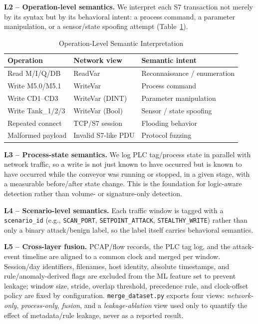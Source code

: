\documentclass[conference]{IEEEtran}
\begin{document}
\textbf{L2 -- Operation-level semantics.} We interpret each S7 transaction not merely by its syntax but by its behavioral intent: a process command, a parameter manipulation, or a sensor/state spoofing attempt (Table~\ref{tab:opsem}).

\begin{table}[t]
\centering
\caption{Operation-Level Semantic Interpretation}
\label{tab:opsem}
\begin{tabular}{p{1.9cm}p{2.0cm}p{2.5cm}}
\toprule
\textbf{Operation} & \textbf{Network view} & \textbf{Semantic intent} \\
\midrule
Read M/I/Q/DB & ReadVar & Reconnaissance / enumeration \\
Write M5.0/M5.1 & WriteVar & Process command \\
Write CD1--CD3 & WriteVar (DINT) & Parameter manipulation \\
Write Tank\_1/2/3 & WriteVar (Bool) & Sensor / state spoofing \\
Repeated connect & TCP/S7 session & Flooding behavior \\
Malformed payload & Invalid S7-like PDU & Protocol fuzzing \\
\bottomrule
\end{tabular}
\end{table}

\textbf{L3 -- Process-state semantics.} We log PLC tag/process state in parallel with network traffic, so a write is not just known to have occurred but is known to have occurred while the conveyor was running or stopped, in a given stage, with a measurable before/after state change. This is the foundation for logic-aware detection rather than volume- or signature-only detection.

\textbf{L4 -- Scenario-level semantics.} Each traffic window is tagged with a \texttt{scenario\_id} (e.g., \texttt{SCAN\_PORT}, \texttt{SETPOINT\_ATTACK}, \texttt{STEALTHY\_WRITE}) rather than only a binary attack/benign label, so the label itself carries behavioral semantics.

\textbf{L5 -- Cross-layer fusion.} PCAP/flow records, the PLC tag log, and the attack-event timeline are aligned to a common clock and merged per window. Session/day identifiers, filenames, host identity, absolute timestamps, and rule/anomaly-derived flags are excluded from the ML feature set to prevent leakage; window size, stride, overlap threshold, precedence rule, and clock-offset policy are fixed by configuration. \texttt{merge\_dataset.py} exports four views: \emph{network-only}, \emph{process-only}, \emph{fusion}, and a \emph{leakage-ablation} view used only to quantify the effect of metadata/rule leakage, never as a reported result.
\end{document}
